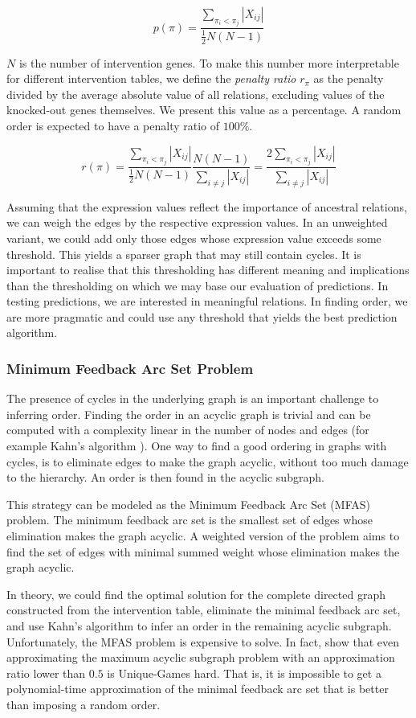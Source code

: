 $$p(\pi) = \frac{\sum_{\pi_i < \pi_j}|X_{ij}|}{\frac{1}{2}N(N-1)}$$

$N$ is the number of intervention genes. To make this number more interpretable for different intervention tables, we define the \textit{penalty ratio} $r_\pi$ as the penalty divided by the average absolute value of all relations, excluding values of the knocked-out genes themselves. We present this value as a percentage. A random order is expected to have a penalty ratio of $100\%$.

$$r(\pi) = \frac{\sum_{\pi_i < \pi_j}|X_{ij}|}{\frac{1}{2}N(N-1)} \frac{N(N-1)}{\sum_{i \neq j}|X_{ij}|} = \frac{2 \sum_{\pi_i < \pi_j}|X_{ij}|}{\sum_{i \neq j}|X_{ij}|}$$

Assuming that the expression values reflect the importance of ancestral relations, we can weigh the edges by the respective expression values. In an unweighted variant, we could add only those edges whose expression value exceeds some threshold. This yields a sparser graph that may still contain cycles. It is important to realise that this thresholding has different meaning and implications than the thresholding on which we may base our evaluation of predictions. In testing predictions, we are interested in meaningful relations. In finding order, we are more pragmatic and could use any threshold that yields the best prediction algorithm.

\subsubsection{Minimum Feedback Arc Set Problem}
The presence of cycles in the underlying graph is an important challenge to inferring order. Finding the order in an acyclic graph is trivial and can be computed with a complexity linear in the number of nodes and edges (for example Kahn's algorithm \citep{kahn1962topological}). One way to find a good ordering in graphs with cycles, is to eliminate edges to make the graph acyclic, without too much damage to the hierarchy. An order is then found in the acyclic subgraph.

This strategy can be modeled as the Minimum Feedback Arc Set (MFAS) problem. The minimum feedback arc set is the smallest set of edges whose elimination makes the graph acyclic. A weighted version of the problem aims to find the set of edges with minimal summed weight whose elimination makes the graph acyclic.

In theory, we could find the optimal solution for the complete directed graph constructed from the intervention table, eliminate the minimal feedback arc set, and use Kahn's algorithm to infer an order in the remaining acyclic subgraph. Unfortunately, the MFAS problem is expensive to solve. In fact, \citet{guruswami2008beating} show that even approximating the maximum acyclic subgraph problem with an approximation ratio lower than $0.5$ is Unique-Games hard. That is, it is impossible to get a polynomial-time approximation of the minimal feedback arc set that is better than imposing a random order.

